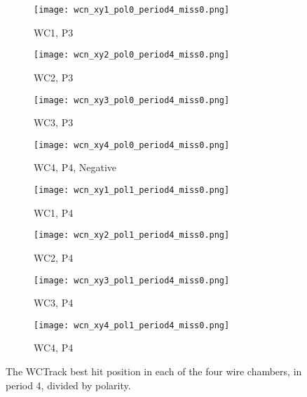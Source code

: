            \begin{figure}[h]	   
            \centering
   
               \begin{subfigure}[b]{0.23\textwidth}
            \centering
            \texttt{[image: wcn\_xy1\_pol0\_period4\_miss0.png]}
            \caption{WC1, P3}
            \label{fig_wc1_p3}
            \end{subfigure}
            \hfill             
             \begin{subfigure}[b]{0.23\textwidth}
            \centering
            \texttt{[image: wcn\_xy2\_pol0\_period4\_miss0.png]}
            \caption{WC2, P3}
            \label{fig_wc2_p3}
            \end{subfigure}
            \hfill 
              \begin{subfigure}[b]{0.23\textwidth}
            \centering
            \texttt{[image: wcn\_xy3\_pol0\_period4\_miss0.png]}
            \caption{WC3, P3}
            \label{fig_wc3_p3}
            \end{subfigure}
            \hfill    
             \begin{subfigure}[b]{0.23\textwidth}
            \centering
            \texttt{[image: wcn\_xy4\_pol0\_period4\_miss0.png]}
            \caption{WC4, P4, Negative}
            \label{fig_wc4_p3}
            \end{subfigure}
            \hfill
            \begin{subfigure}[b]{0.23\textwidth}
            \centering
            \texttt{[image: wcn\_xy1\_pol1\_period4\_miss0.png]}
            \caption{WC1, P4}
            \label{fig_wc1_p4}
            \end{subfigure}
            \hfill             
             \begin{subfigure}[b]{0.23\textwidth}
            \centering
            \texttt{[image: wcn\_xy2\_pol1\_period4\_miss0.png]}
            \caption{WC2, P4}
            \label{fig_wc2_p4}
            \end{subfigure}
            \hfill 
              \begin{subfigure}[b]{0.23\textwidth}
            \centering
            \texttt{[image: wcn\_xy3\_pol1\_period4\_miss0.png]}
            \caption{WC3, P4}
            \label{fig_wc3_p4}
            \end{subfigure}
            \hfill    
             \begin{subfigure}[b]{0.23\textwidth}
            \centering
            \texttt{[image: wcn\_xy4\_pol1\_period4\_miss0.png]}
            \caption{WC4, P4}
            \label{fig_wc4_p4}
            \end{subfigure}
            \hfill
   \caption[short]{The WCTrack best hit position in each of the four wire chambers, in period 4, divided by polarity.}
   \label{fig_xyhitspol}
  \end{figure}
  

